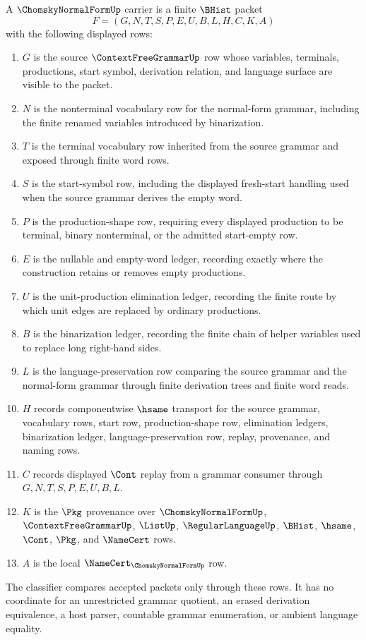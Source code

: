 \begin{definition}
\label{def:chomsky-normal-form-carrier}
A $\ChomskyNormalFormUp$ carrier is a finite $\BHist$ packet
$$
F=(G,N,T,S,P,E,U,B,L,H,C,K,A)
$$
with the following displayed rows:
\begin{enumerate}
\item $G$ is the source $\ContextFreeGrammarUp$ row whose variables, terminals, productions, start symbol, derivation relation, and language surface are visible to the packet.
\item $N$ is the nonterminal vocabulary row for the normal-form grammar, including the finite renamed variables introduced by binarization.
\item $T$ is the terminal vocabulary row inherited from the source grammar and exposed through finite word rows.
\item $S$ is the start-symbol row, including the displayed fresh-start handling used when the source grammar derives the empty word.
\item $P$ is the production-shape row, requiring every displayed production to be terminal, binary nonterminal, or the admitted start-empty row.
\item $E$ is the nullable and empty-word ledger, recording exactly where the construction retains or removes empty productions.
\item $U$ is the unit-production elimination ledger, recording the finite route by which unit edges are replaced by ordinary productions.
\item $B$ is the binarization ledger, recording the finite chain of helper variables used to replace long right-hand sides.
\item $L$ is the language-preservation row comparing the source grammar and the normal-form grammar through finite derivation trees and finite word reads.
\item $H$ records componentwise $\hsame$ transport for the source grammar, vocabulary rows, start row, production-shape row, elimination ledgers, binarization ledger, language-preservation row, replay, provenance, and naming rows.
\item $C$ records displayed $\Cont$ replay from a grammar consumer through $G,N,T,S,P,E,U,B,L$.
\item $K$ is the $\Pkg$ provenance over $\ChomskyNormalFormUp$, $\ContextFreeGrammarUp$, $\ListUp$, $\RegularLanguageUp$, $\BHist$, $\hsame$, $\Cont$, $\Pkg$, and $\NameCert$ rows.
\item $A$ is the local $\NameCert_{\ChomskyNormalFormUp}$ row.
\end{enumerate}
The classifier compares accepted packets only through these rows. It has no coordinate for an unrestricted grammar quotient, an erased derivation equivalence, a host parser, countable grammar enumeration, or ambient language equality.
\end{definition}

